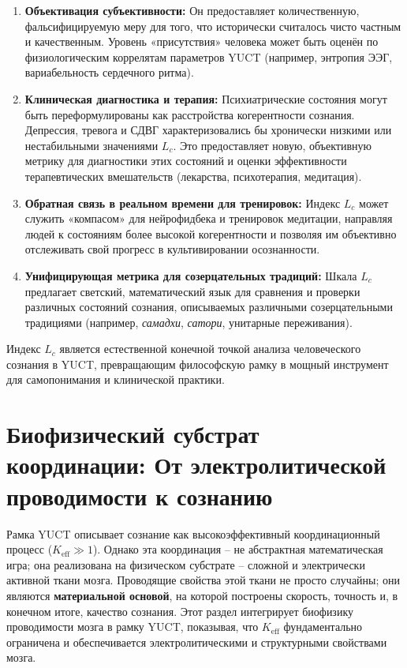 \documentclass[12pt,a4paper]{article}
\begin{document}
	\begin{enumerate}
		\item \textbf{Объективация субъективности:} Он предоставляет количественную, фальсифицируемую меру для того, что исторически считалось чисто частным и качественным. Уровень «присутствия» человека может быть оценён по физиологическим коррелятам параметров YUCT (например, энтропия ЭЭГ, вариабельность сердечного ритма).
		\item \textbf{Клиническая диагностика и терапия:} Психиатрические состояния могут быть переформулированы как расстройства когерентности сознания. Депрессия, тревога и СДВГ характеризовались бы хронически низкими или нестабильными значениями \(L_c\). Это предоставляет новую, объективную метрику для диагностики этих состояний и оценки эффективности терапевтических вмешательств (лекарства, психотерапия, медитация).
		\item \textbf{Обратная связь в реальном времени для тренировок:} Индекс \(L_c\) может служить «компасом» для нейрофидбека и тренировок медитации, направляя людей к состояниям более высокой когерентности и позволяя им объективно отслеживать свой прогресс в культивировании осознанности.
		\item \textbf{Унифицирующая метрика для созерцательных традиций:} Шкала \(L_c\) предлагает светский, математический язык для сравнения и проверки различных состояний сознания, описываемых различными созерцательными традициями (например, \textit{самадхи}, \textit{сатори}, унитарные переживания).
	\end{enumerate}
	
	Индекс \(L_c\) является естественной конечной точкой анализа человеческого сознания в YUCT, превращающим философскую рамку в мощный инструмент для самопонимания и клинической практики.
	
	\section{Биофизический субстрат координации: От электролитической проводимости к сознанию}
	
	Рамка YUCT описывает сознание как высокоэффективный координационный процесс (\(K_{\mathrm{eff}} \gg 1\)). Однако эта координация – не абстрактная математическая игра; она реализована на физическом субстрате – сложной и электрически активной ткани мозга. Проводящие свойства этой ткани не просто случайны; они являются \textbf{материальной основой}, на которой построены скорость, точность и, в конечном итоге, качество сознания. Этот раздел интегрирует биофизику проводимости мозга в рамку YUCT, показывая, что \(K_{\mathrm{eff}}\) фундаментально ограничена и обеспечивается электролитическими и структурными свойствами мозга.
	
\end{document}
